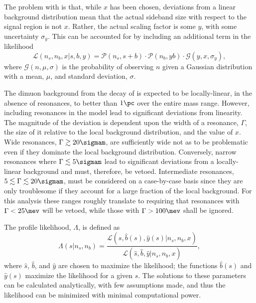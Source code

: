 The problem with  is that, while $x$ has been chosen, deviations from a linear
background distribution mean that the actual sideband size with respect to the signal region is not
$x$.
Rather, the actual scaling factor is some $y$, with some uncertainty $\sigma_y$.
This can be accounted for by including an additional term in the likelihood
\begin{equation}
  \mathcal{L}(n_s, n_b, x | s, b, y) =
  \mathcal{P}(n_s, s+b) \cdot
  \mathcal{P}(n_b, yb) \cdot
  \mathcal{G}(y,x,\sigma_y),
  \label{eq:db:like2}
\end{equation}
where $\mathcal{G}(n, \mu, \sigma)$ is the probability of observing $n$ given a Gaussian
distribution with a mean, $\mu$, and standard deviation, $\sigma$.

The dimuon background from the \sm decay of \btokstrmumu is expected to be locally-linear, in the
absence of resonances, to better than $1\pc$ over the entire mass range.
However, including resonances in the model lead to significant deviations from linearity.
The magnitude of the deviation is dependent upon the width of a resonance, $\Gamma$, the size of it
relative to the local background distribution, and the value of $x$.
Wide resonances, $\Gamma\gtrsim20\sigmam$, are sufficiently wide not as to be problematic even if
they dominate the local background distribution.
Conversely, narrow resonances where $\Gamma\lesssim5\sigmam$ lead to significant deviations from a
locally-linear background and must, therefore, be vetoed.
Intermediate resonances, $5\lesssim\Gamma\lesssim20\sigmam$, must be considered on a case-by-case
basis since they are only troublesome if they account for a large fraction of the local background.
For this analysis these ranges roughly translate to requiring that resonances with $\Gamma<25\mev$
will be vetoed, while those with $\Gamma>100\mev$ shall be ignored.


The profile likelihood, $\Lambda$, is defined as
\begin{equation}
  \Lambda(s|n_s,n_b) =
  \frac
  {\mathcal{L}(s, \hat{b}(s), \hat{y}(s) | n_s, n_b, x)}
  {\mathcal{L}(\hat{s}, \hat{b}, \hat{y} | n_s, n_b, x)},
  \label{eq:profilelike1}
\end{equation}
where $\hat{s}$, $\hat{b}$, and $\hat{y}$ are chosen to maximize the likelihood; the functions
$\hat{b}(s)$ and $\hat{y}(s)$ maximize the likelihood for a given $s$.
The solutions to these parameters can be calculated analytically, with few assumptions made,
and thus the likelihood can be minimized with minimal computational power.


